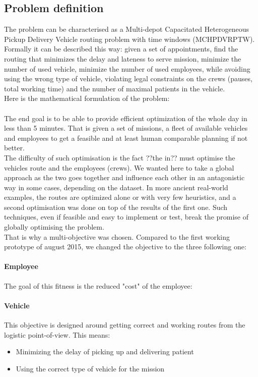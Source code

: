 \documentclass[12pt]{memoir}
\begin{document}
\subsection{Problem definition}
The problem can be characterised as a Multi-depot Capacitated Heterogeneous Pickup
Delivery Vehicle routing problem with time windows (MCHPDVRPTW). \\
Formally it can be described this way: given a set of appointments, find the routing that minimizes the
delay and lateness to serve mission, minimize the number of used vehicle, minimize
the number of used employees, while avoiding using the wrong type of vehicle,
violating legal constraints on the crews (pauses, total working time) and the number
of maximal patients in the vehicle.\\
Here is the mathematical formulation of the problem:
%
%
\\
\\
The end goal is to be able to provide efficient optimization of the whole day in
less than 5 minutes. That is given a set of missions, a fleet of available vehicles
and employees to get a feasible and at least human comparable planning if not
better. \\
The difficulty of such optimisation is the fact ??the in?? must optimise the vehicles
route and the employees (crews). We wanted here to take a global approach as the two
goes together and influence each other in an antagonistic way in some cases, depending
on the dataset. In more ancient real-world examples, the routes are optimized alone
or with very few heuristics, and a second optimisation was done on top of the results
of the first one. Such techniques, even if feasible and easy to implement or test,
break the promise of globally optimising the problem.\\
That is why a multi-objective was chosen. Compared to the first working prototype
of august 2015, we changed the objective to the three following one:

\paragraph{Employee} %
\label{par:Employee}
The goal of this fitness is the reduced "cost" of the employee:


\paragraph{Vehicle} %
\label{par:Vehicle}
This objective is designed around getting correct and working routes from the
logistic point-of-view. This means:
\begin{itemize}
  \item Minimizing the delay of picking up and delivering patient
  \item Using the correct type of vehicle for the mission
\end{itemize}
\end{document}
